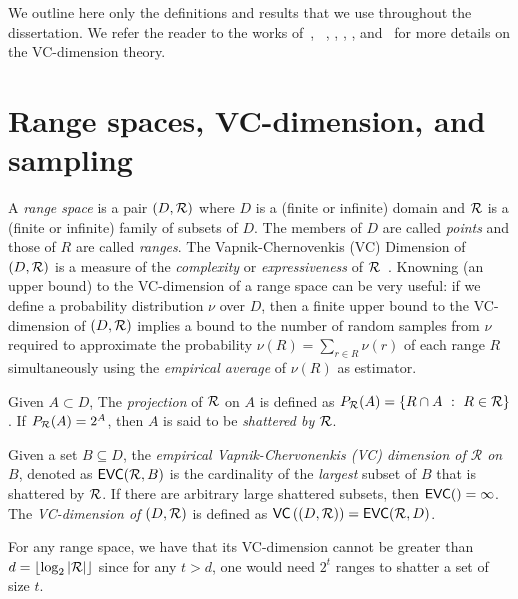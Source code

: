 We outline here only the definitions and results that we use throughout the
dissertation. We refer the reader to the works of~\citet[Sect.~14.4]{AlonS08},
~\citet[Sect.~3]{BoucheronBL05}, \citet[Chap.~4]{Chazelle00},
\citet[Sect.~12.4]{DevroyeGL96}, \citet[Chap.~3]{MohriRT12},
and~\citet{Vapnik99,Vapnik98} for more details on the VC-dimension theory. 

\section{Range spaces, VC-dimension, and sampling}
A {\em range space} is a pair $(D,\mathcal{R})$ where $D$ is a (finite or infinite)
domain and $\mathcal{R}$ is a (finite or infinite) family of subsets of $D$. The
members of $D$ are called {\em points} and those of $R$ are called {\em ranges}.
The Vapnik-Chernovenkis (VC) Dimension of $(D,\mathcal{R})$ is a measure of the
\emph{complexity} or \emph{expressiveness} of $\mathcal{R}$~\citep{VapnikC71}.
Knowning (an upper bound) to the VC-dimension of a range space can be very
useful: if we define a probability distribution $\nu$ over $D$, then a finite
upper bound to the VC-dimension of $(D,\mathcal{R})$ implies a bound to the number of
random samples from $\nu$ required to approximate the probability
$\nu(R)=\sum_{r\in R}\nu(r)$ of each range $R$ simultaneously using the
\emph{empirical average} of $\nu(R)$ as estimator. 

Given $A\subset D$, The {\em projection} of $\mathcal{R}$ on $A$ is defined as
$P_{\mathcal{R}}(A)=\{R\cap A ~:~ R\in\mathcal{R}\}$. If $P_{\mathcal{R}}(A)=2^A$, then $A$ is said
to be {\em shattered by $\mathcal{R}$}. 

\begin{definition}\label{def:vcdim}
  Given a set $B\subseteq D$, the \emph{empirical Vapnik-Chervonenkis (VC)
  dimension of $\mathcal{R}$ on $B$}, denoted as $\mathsf{EVC}(\mathcal{R},B)$ is the
  cardinality of the \emph{largest} subset of $B$ that is shattered by $\mathcal{R}$. If
  there are arbitrary large shattered subsets, then $\mathsf{EVC}()=\infty$. The
  \emph{VC-dimension of $(D,\mathcal{R})$} is defined as
  $\mathsf{VC}\left((D,\mathcal{R})\right)=\mathsf{EVC}(\mathcal{R},D)$.
\end{definition}

For any range space, we have that its VC-dimension cannot be greater than
$d=\lfloor\log_2|\mathcal{R}|\rfloor$ since for any $t>d$, one would need $2^t$
ranges to shatter a set of size $t$. 

